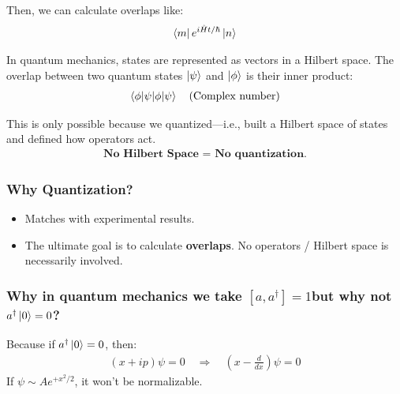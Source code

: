 \documentclass[14pt]{article} %
\begin{document}
Then, we can calculate overlaps like:
\begin{align*}
\bra{m} e^{i\hat{H}t/\hbar} \ket{n}
\end{align*}
\begin{tcolorbox}[ title=Overlaps]
In quantum mechanics, states are represented as vectors in a Hilbert space. The overlap between two quantum states \( \ket{\psi} \) and \( \ket{\phi} \) is their inner product:
\begin{align*}
\braket{\phi|\psi} \quad \text{(Complex number)}
\end{align*}
\end{tcolorbox}
This is only possible because we quantized—i.e., built a Hilbert space of states and defined how operators act.
\begin{align*}
\boxed{\textbf{No Hilbert Space = No quantization.}}
\end{align*}

\subsubsection{Why Quantization?}
\begin{itemize}
    \item Matches with experimental results.
    \item The ultimate goal is to calculate \textbf{overlaps}. No operators / Hilbert space is necessarily involved.
\end{itemize}
\vspace{1cm}
\begin{tcolorbox}[ title=Note]
\subsubsection*{Why in quantum mechanics we take \( [a, a^\dagger] = 1 \)but why not \( a^\dagger \ket{0} = 0 \)?}
Because if \( a^\dagger \ket{0} = 0 \), then:
\begin{align*}
(x + ip) \psi = 0 \quad \Rightarrow \quad \left( x - \frac{d}{dx} \right) \psi = 0
\end{align*}
If \( \psi \sim A e^{+x^2/2} \), it won't be normalizable.
\end{tcolorbox}
\end{document}
